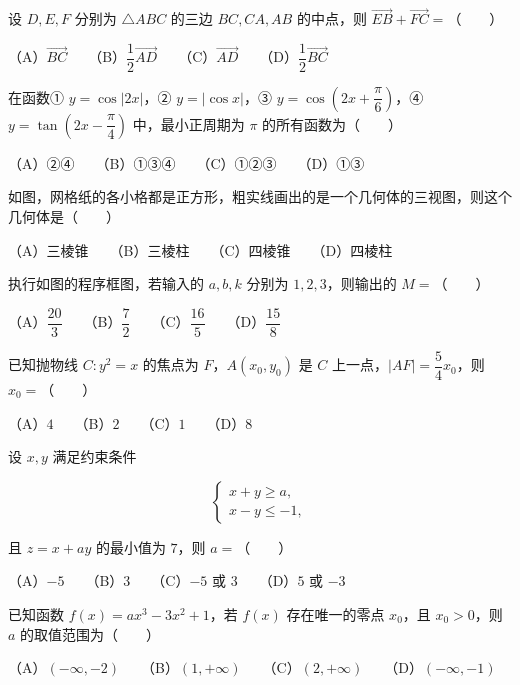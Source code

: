 \begin{question}
设 $D,E,F$ 分别为 $\triangle ABC$ 的三边 $BC,CA,AB$ 的中点，则 $\overrightarrow{EB}+\overrightarrow{FC}=$\mbox{（　　）}

（A）$\overrightarrow{BC}$　　（B）$\dfrac12\overrightarrow{AD}$　　（C）$\overrightarrow{AD}$　　（D）$\dfrac12\overrightarrow{BC}$

\end{question}
\begin{question}
在函数① $y=\cos|2x|$，② $y=|\cos x|$，③ $y=\cos\left(2x+\dfrac\pi6\right)$，④ $y=\tan\left(2x-\dfrac\pi4\right)$ 中，最小正周期为 $\pi$ 的所有函数为\mbox{（　　）}

（A）②④　　（B）①③④　　（C）①②③　　（D）①③

\Needspace{0.4\textheight}
\end{question}
\begin{question}
如图，网格纸的各小格都是正方形，粗实线画出的是一个几何体的三视图，则这个几何体是\mbox{（　　）}
\nopagebreak[4]
\begin{center}\end{center}
\nopagebreak[4]
（A）三棱锥　　（B）三棱柱　　（C）四棱锥　　（D）四棱柱

\Needspace{0.4\textheight}
\end{question}
\begin{question}
执行如图的程序框图，若输入的 $a,b,k$ 分别为 $1,2,3$，则输出的 $M=$\mbox{（　　）}
\nopagebreak[4]
\begin{center}\end{center}
\nopagebreak[4]
（A）$\dfrac{20}{3}$　　（B）$\dfrac72$　　（C）$\dfrac{16}{5}$　　（D）$\dfrac{15}{8}$

\end{question}
\begin{question}
已知抛物线 $C:y^2=x$ 的焦点为 $F$，$A(x_0,y_0)$ 是 $C$ 上一点，$|AF|=\dfrac54x_0$，则 $x_0=$\mbox{（　　）}

（A）$4$　　（B）$2$　　（C）$1$　　（D）$8$

\end{question}
\begin{question}
设 $x,y$ 满足约束条件

\nopagebreak[4]
\[
\begin{cases}
x+y\geqslant a,\\
x-y\leqslant-1,
\end{cases}
\]

且 $z=x+ay$ 的最小值为 $7$，则 $a=$\mbox{（　　）}

（A）$-5$　　（B）$3$　　（C）$-5$ 或 $3$　　（D）$5$ 或 $-3$

\end{question}
\begin{question}
已知函数 $f(x)=ax^3-3x^2+1$，若 $f(x)$ 存在唯一的零点 $x_0$，且 $x_0>0$，则 $a$ 的取值范围为\mbox{（　　）}

（A）$(-\infty,-2)$　　（B）$(1,+\infty)$　　（C）$(2,+\infty)$　　（D）$(-\infty,-1)$

\end{question}

